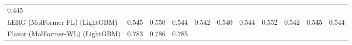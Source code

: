 \documentclass[
  10pt,
]{article}
\begin{document}
\begin{longtable}[]{@{}lllllllllll@{}}
\begin{minipage}[t]{0.07\columnwidth}
0.445\strut
\end{minipage}\tabularnewline
\begin{minipage}[t]{0.07\columnwidth}\raggedright
hERG (MolFormer-FL) (LightGBM)\strut
\end{minipage} & \begin{minipage}[t]{0.07\columnwidth}\raggedright
0.545\strut
\end{minipage} & \begin{minipage}[t]{0.07\columnwidth}\raggedright
0.550\strut
\end{minipage} & \begin{minipage}[t]{0.07\columnwidth}\raggedright
0.544\strut
\end{minipage} & \begin{minipage}[t]{0.07\columnwidth}\raggedright
0.542\strut
\end{minipage} & \begin{minipage}[t]{0.07\columnwidth}\raggedright
0.540\strut
\end{minipage} & \begin{minipage}[t]{0.07\columnwidth}\raggedright
0.544\strut
\end{minipage} & \begin{minipage}[t]{0.07\columnwidth}\raggedright
0.552\strut
\end{minipage} & \begin{minipage}[t]{0.07\columnwidth}\raggedright
0.542\strut
\end{minipage} & \begin{minipage}[t]{0.07\columnwidth}\raggedright
0.545\strut
\end{minipage} & \begin{minipage}[t]{0.07\columnwidth}\raggedright
0.544\strut
\end{minipage}\tabularnewline
\begin{minipage}[t]{0.07\columnwidth}\raggedright
Flavor (MolFormer-WL) (LightGBM)\strut
\end{minipage} & \begin{minipage}[t]{0.07\columnwidth}\raggedright
0.783\strut
\end{minipage} & \begin{minipage}[t]{0.07\columnwidth}\raggedright
0.786\strut
\end{minipage} & \begin{minipage}[t]{0.07\columnwidth}\raggedright
0.785\strut
\end{minipage} & \begin{minipage}[t]{0.07\columnwidth}\raggedright

\end{minipage}
\end{longtable}
\end{document}
